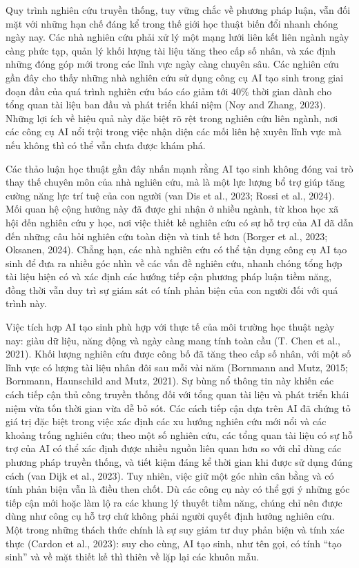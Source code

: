 Quy trình nghiên cứu truyền thống, tuy vững chắc về phương pháp luận, vẫn đối mặt với những hạn chế đáng kể trong thế giới học thuật biến đổi nhanh chóng ngày nay. Các nhà nghiên cứu phải xử lý một mạng lưới liên kết liên ngành ngày càng phức tạp, quản lý khối lượng tài liệu tăng theo cấp số nhân, và xác định những đóng góp mới trong các lĩnh vực ngày càng chuyên sâu. Các nghiên cứu gần đây cho thấy những nhà nghiên cứu sử dụng công cụ AI tạo sinh trong giai đoạn đầu của quá trình nghiên cứu báo cáo giảm tới 40\% thời gian dành cho tổng quan tài liệu ban đầu và phát triển khái niệm (Noy and Zhang, 2023). Những lợi ích về hiệu quả này đặc biệt rõ rệt trong nghiên cứu liên ngành, nơi các công cụ AI nổi trội trong việc nhận diện các mối liên hệ xuyên lĩnh vực mà nếu không thì có thể vẫn chưa được khám phá.

Các thảo luận học thuật gần đây nhấn mạnh rằng AI tạo sinh không đóng vai trò thay thế chuyên môn của nhà nghiên cứu, mà là một lực lượng bổ trợ giúp tăng cường năng lực trí tuệ của con người (van Dis et al., 2023; Rossi et al., 2024). Mối quan hệ cộng hưởng này đã được ghi nhận ở nhiều ngành, từ khoa học xã hội đến nghiên cứu y học, nơi việc thiết kế nghiên cứu có sự hỗ trợ của AI đã dẫn đến những câu hỏi nghiên cứu toàn diện và tinh tế hơn (Borger et al., 2023; Oksanen, 2024). Chẳng hạn, các nhà nghiên cứu có thể tận dụng công cụ AI tạo sinh để đưa ra nhiều góc nhìn về các vấn đề nghiên cứu, nhanh chóng tổng hợp tài liệu hiện có và xác định các hướng tiếp cận phương pháp luận tiềm năng, đồng thời vẫn duy trì sự giám sát có tính phản biện của con người đối với quá trình này.

Việc tích hợp AI tạo sinh phù hợp với thực tế của môi trường học thuật ngày nay: giàu dữ liệu, năng động và ngày càng mang tính toàn cầu (T. Chen et al., 2021). Khối lượng nghiên cứu được công bố đã tăng theo cấp số nhân, với một số lĩnh vực có lượng tài liệu nhân đôi sau mỗi vài năm (Bornmann and Mutz, 2015; Bornmann, Haunschild and Mutz, 2021). Sự bùng nổ thông tin này khiến các cách tiếp cận thủ công truyền thống đối với tổng quan tài liệu và phát triển khái niệm vừa tốn thời gian vừa dễ bỏ sót. Các cách tiếp cận dựa trên AI đã chứng tỏ giá trị đặc biệt trong việc xác định các xu hướng nghiên cứu mới nổi và các khoảng trống nghiên cứu; theo một số nghiên cứu, các tổng quan tài liệu có sự hỗ trợ của AI có thể xác định được nhiều nguồn liên quan hơn so với chỉ dùng các phương pháp truyền thống, và tiết kiệm đáng kể thời gian khi được sử dụng đúng cách (van Dijk et al., 2023). Tuy nhiên, việc giữ một góc nhìn cân bằng và có tính phản biện vẫn là điều then chốt. Dù các công cụ này có thể gợi ý những góc tiếp cận mới hoặc làm lộ ra các khung lý thuyết tiềm năng, chúng chỉ nên được dùng như công cụ hỗ trợ chứ không phải người quyết định hướng nghiên cứu. Một trong những thách thức chính là sự suy giảm tư duy phản biện và tính xác thực (Cardon et al., 2023): suy cho cùng, AI tạo sinh, như tên gọi, có tính ``tạo sinh'' và về mặt thiết kế thì thiên về lặp lại các khuôn mẫu.

